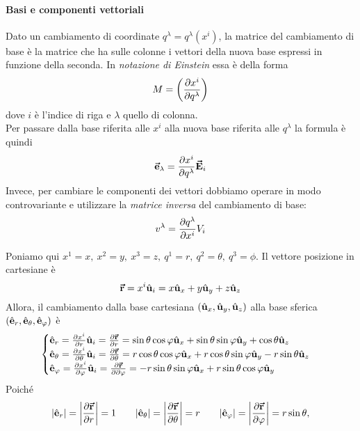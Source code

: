 \paragraph{Basi e componenti vettoriali}
\begin{remember}
	Dato un cambiamento di coordinate $q^\lambda=q^\lambda(x^i)$, la matrice del cambiamento di base è la matrice che ha sulle colonne i vettori della nuova base espressi in funzione della seconda.
	In \textit{notazione di Einstein} essa è della forma
	\begin{equation}
		M=\left(\pdv{x^i}{q^\lambda}\right)
	\end{equation}
	dove $i$ è l'indice di riga e $\lambda$ quello di colonna.\\
	Per passare dalla base riferita alle $x^i$ alla nuova base riferita alle $q^\lambda$ la formula è quindi
	\begin{equation}
		\vb*{\va{e}}_\lambda=\pdv{x^i}{q^\lambda}\vb*{\va{E}}_i
	\end{equation}
	Invece, per cambiare le componenti dei vettori dobbiamo operare in modo controvariante e utilizzare la \textit{matrice inversa} del cambiamento di base:
	\begin{equation}
		v^\lambda=\pdv{q^\lambda}{x^i}V_i
	\end{equation}
\end{remember}
\noindent Poniamo qui $x^1=x,\ x^2=y,\ x^3=z,\ q^1=r,\ q^2=\theta,\ q^3=\phi$.
Il vettore posizione in cartesiane è
\begin{equation*}
	\vb*{\va{r}}=x^i\hat{\mathbf{u}}_i=x\hat{\mathbf{u}}_x+y\hat{\mathbf{u}}_y+z\hat{\mathbf{u}}_z
\end{equation*}
Allora, il cambiamento dalla base cartesiana $\left(\hat{\mathbf{u}}_x,\hat{\mathbf{u}}_y,\hat{\mathbf{u}}_z\right)$ alla base sferica $\left(\hat{\mathbf{e}}_r,\hat{\mathbf{e}}_\theta,\hat{\mathbf{e}}_\varphi\right)$ è
\begin{equation}
	\begin{cases}
		\hat{\mathbf{e}}_r=\pdv{x^i}{r}\hat{\mathbf{u}}_i=\pdv{\vb*{\va{r}}}{r}=\sin\theta\cos\varphi\hat{\mathbf{u}}_x+\sin\theta\sin\varphi\hat{\mathbf{u}}_y+\cos\theta\hat{\mathbf{u}}_z\\
		\hat{\mathbf{e}}_\theta=\pdv{x^i}{\theta}\hat{\mathbf{u}}_i=\pdv{\vb*{\va{r}}}{\theta}=r\cos\theta\cos\varphi\hat{\mathbf{u}}_x+r\cos\theta\sin\varphi\hat{\mathbf{u}}_y-r\sin\theta\hat{\mathbf{u}}_z\\
		\hat{\mathbf{e}}_\varphi=\pdv{x^i}{\varphi}\hat{\mathbf{u}}_i=\pdv{\vb*{\va{r}}}{\partial \varphi}=-r\sin\theta\sin\varphi\hat{\mathbf{u}}_x+r\sin\theta\cos\varphi\hat{\mathbf{u}}_y
	\end{cases}
\end{equation}
Poiché
\begin{equation}
	\abs{\hat{\mathbf{e}}_r}=\abs{\pdv{\vb*{\va{r}}}{r}}=1\qquad\abs{\hat{\mathbf{e}}_\theta}=\abs{\pdv{\vb*{\va{r}}}{\theta}}=r\qquad\abs{\hat{\mathbf{e}}_\varphi}=\abs{\pdv{\vb*{\va{r}}}{\varphi}}=r\sin\theta,
\end{equation}
